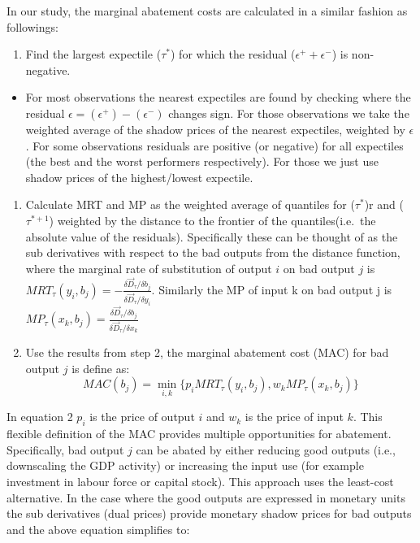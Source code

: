 \documentclass[
  10pt,
]{article}
\providecommand{\tightlist}{%
  \setlength{\itemsep}{0pt}\setlength{\parskip}{0pt}}
\begin{document}
In our study, the marginal abatement costs are calculated in a similar
fashion as followings:

\begin{enumerate}
\def\labelenumi{\arabic{enumi}.}
\tightlist
\item
  Find the largest expectile (\(\tau^{*}\)) for which the residual
  (\(\epsilon^+ + \epsilon^-\)) is non-negative.
\end{enumerate}

\begin{itemize}
\tightlist
\item
  For most observations the nearest expectiles are found by checking
  where the residual \(\epsilon = (\epsilon^+) - (\epsilon^-)\) changes
  sign. For those observations we take the weighted average of the
  shadow prices of the nearest expectiles, weighted by \(\epsilon\). For
  some observations residuals are positive (or negative) for all
  expectiles (the best and the worst performers respectively). For those
  we just use shadow prices of the highest/lowest expectile.
\end{itemize}

\begin{enumerate}
\def\labelenumi{\arabic{enumi}.}
\setcounter{enumi}{1}
\item
  Calculate MRT and MP as the weighted average of quantiles for
  (\(\tau^{*}\))r and (\(\tau^{*+1}\)) weighted by the distance to the
  frontier of the quantiles(i.e.~the absolute value of the residuals).
  Specifically these can be thought of as the sub derivatives with
  respect to the bad outputs from the distance function, where the
  marginal rate of substitution of output \(i\) on bad output \(j\) is
  \(MRT_{\tau}(y_{i},b_{j})=-\frac{\delta \vec{D}_{\tau}/\delta b_{j}}{\delta \vec{D}_{\tau}/\delta y_{i}}\).
  Similarly the MP of input k on bad output j is
  \(MP_{\tau}(x_{k},b_{j})=\frac{\delta \vec{D}_{\tau}/\delta b_{j}}{\delta \vec{D}_{\tau}/\delta x_{k}}\)
\item
  Use the results from step 2, the marginal abatement cost (MAC) for bad
  output \(j\) is define as: \begin{equation}
  MAC(b_{j})=\displaystyle \min_{i,k}\{p_{i}MRT_{\tau}(y_{i},b_{j}), w_{k}MP_{\tau}(x_{k},b_{j})\}
  \end{equation}
\end{enumerate}

In equation 2 \(p_{i}\) is the price of output \(i\) and \(w_{k}\) is
the price of input \(k\). This flexible definition of the MAC provides
multiple opportunities for abatement. Specifically, bad output \(j\) can
be abated by either reducing good outputs (i.e., downscaling the GDP
activity) or increasing the input use (for example investment in labour
force or capital stock). This approach uses the least-cost alternative.
In the case where the good outputs are expressed in monetary units the
sub derivatives (dual prices) provide monetary shadow prices for bad
outputs and the above equation simplifies to:
\end{document}
